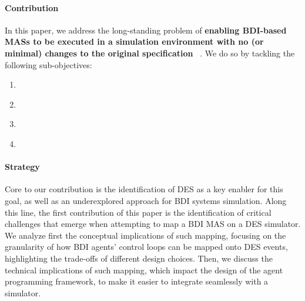 \paragraph{Contribution}

In this paper,
we address the long-standing problem of
\textbf{
enabling \ac{BDI}-based \acp{MAS} to be executed in a simulation environment
with no (or minimal) changes to the original specification
}~\cite{uhrmacher_simulation_2002}.
%
We do so by tackling the following sub-objectives:
\begin{enumerate}[label=\textbf{O\arabic*}]
    \item\label{rq:methods}
    \item\label{rq:abstract-spec}
    \item\label{rq:des}
    \item\label{rq:sim-integration}
\end{enumerate}

\paragraph{Strategy}
Core to our contribution is the identification of \ac{DES} as a key enabler for this goal,
as well as an underexplored approach for \ac{BDI} systems simulation.
%
Along this line,
the first contribution of this paper is the
identification of critical challenges that emerge when
attempting to map a \ac{BDI} \ac{MAS} on a \ac{DES} simulator.
%
We analyze first the conceptual implications of such mapping,
focusing on the granularity of how \ac{BDI} agents' control loops can be mapped onto \ac{DES} events,
highlighting the trade-offs of different design choices.
%
Then, we discuss the technical implications of such mapping,
which impact the design of the agent programming framework,
to make it easier to integrate seamlessly with a simulator.

